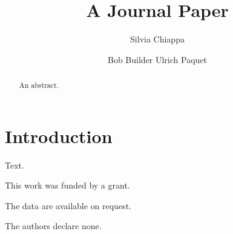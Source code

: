 \documentclass{svjour3}
\begin{document}
\title{A Journal Paper}
\author{Silvia Chiappa \and Bob Builder \lastand Ulrich Paquet}
\maketitle
\begin{abstract}An abstract.\end{abstract}
\section{Introduction}
Text.
\begin{funding}This work was funded by a grant.\end{funding}
\begin{dataavailability}The data are available on request.\end{dataavailability}
\begin{conflict}The authors declare none.\end{conflict}
\end{document}
